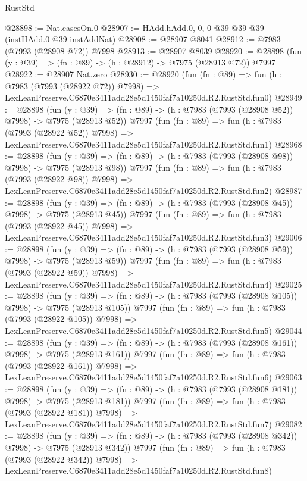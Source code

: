 \begin{lexlean}{RustStd}
\begin{coremodule}
@28898 := Nat.casesOn.{0}
@28907 := HAdd.hAdd.{0, 0, 0} @39 @39 @39 (instHAdd.{0} @39 instAddNat)
@28908 := @28907 @8041
@28912 := @7983 (@7993 (@28908 @72)) @7998
@28913 := @28907 @8039
@28920 := @28898 (fun (y : @39) => (fn : @89) -> (h : @28912) -> @7975 (@28913 @72)) @7997
@28922 := @28907 Nat.zero
@28930 := @28920
    (fun (fn : @89) =>
    fun (h : @7983 (@7993 (@28922 @72)) @7998) =>
    LexLeanPreserve.C6870e3411add28e5d1450faf7a10250d.R2.RustStd.fun0)
@28949 := @28898
    (fun (y : @39) => (fn : @89) -> (h : @7983 (@7993 (@28908 @52)) @7998) -> @7975 (@28913 @52))
    @7997
    (fun (fn : @89) =>
    fun (h : @7983 (@7993 (@28922 @52)) @7998) =>
    LexLeanPreserve.C6870e3411add28e5d1450faf7a10250d.R2.RustStd.fun1)
@28968 := @28898
    (fun (y : @39) => (fn : @89) -> (h : @7983 (@7993 (@28908 @98)) @7998) -> @7975 (@28913 @98))
    @7997
    (fun (fn : @89) =>
    fun (h : @7983 (@7993 (@28922 @98)) @7998) =>
    LexLeanPreserve.C6870e3411add28e5d1450faf7a10250d.R2.RustStd.fun2)
@28987 := @28898
    (fun (y : @39) => (fn : @89) -> (h : @7983 (@7993 (@28908 @45)) @7998) -> @7975 (@28913 @45))
    @7997
    (fun (fn : @89) =>
    fun (h : @7983 (@7993 (@28922 @45)) @7998) =>
    LexLeanPreserve.C6870e3411add28e5d1450faf7a10250d.R2.RustStd.fun3)
@29006 := @28898
    (fun (y : @39) => (fn : @89) -> (h : @7983 (@7993 (@28908 @59)) @7998) -> @7975 (@28913 @59))
    @7997
    (fun (fn : @89) =>
    fun (h : @7983 (@7993 (@28922 @59)) @7998) =>
    LexLeanPreserve.C6870e3411add28e5d1450faf7a10250d.R2.RustStd.fun4)
@29025 := @28898
    (fun (y : @39) => (fn : @89) -> (h : @7983 (@7993 (@28908 @105)) @7998) -> @7975 (@28913 @105))
    @7997
    (fun (fn : @89) =>
    fun (h : @7983 (@7993 (@28922 @105)) @7998) =>
    LexLeanPreserve.C6870e3411add28e5d1450faf7a10250d.R2.RustStd.fun5)
@29044 := @28898
    (fun (y : @39) => (fn : @89) -> (h : @7983 (@7993 (@28908 @161)) @7998) -> @7975 (@28913 @161))
    @7997
    (fun (fn : @89) =>
    fun (h : @7983 (@7993 (@28922 @161)) @7998) =>
    LexLeanPreserve.C6870e3411add28e5d1450faf7a10250d.R2.RustStd.fun6)
@29063 := @28898
    (fun (y : @39) => (fn : @89) -> (h : @7983 (@7993 (@28908 @181)) @7998) -> @7975 (@28913 @181))
    @7997
    (fun (fn : @89) =>
    fun (h : @7983 (@7993 (@28922 @181)) @7998) =>
    LexLeanPreserve.C6870e3411add28e5d1450faf7a10250d.R2.RustStd.fun7)
@29082 := @28898
    (fun (y : @39) => (fn : @89) -> (h : @7983 (@7993 (@28908 @342)) @7998) -> @7975 (@28913 @342))
    @7997
    (fun (fn : @89) =>
    fun (h : @7983 (@7993 (@28922 @342)) @7998) =>
    LexLeanPreserve.C6870e3411add28e5d1450faf7a10250d.R2.RustStd.fun8)

\end{coremodule}
\end{lexlean}
